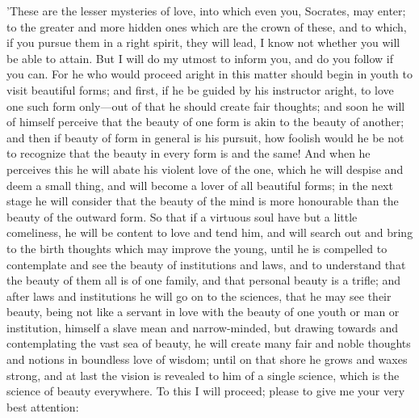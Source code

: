 \para[121] 'These are the lesser mysteries of love, into which even you, Socrates, may enter; to the greater and more hidden ones which are the crown of these, and to which, if you pursue them in a right spirit, they will lead, I know not whether you will be able to attain. But I will do my utmost to inform you, and do you follow if you can. For he who would proceed aright in this matter should begin in youth to visit beautiful forms; and first, if he be guided by his instructor aright, to love one such form only---out of that he should create fair thoughts; and soon he will of himself perceive that the beauty of one form is akin to the beauty of another; and then if beauty of form in general is his pursuit, how foolish would he be not to recognize that the beauty in every form is and the same! And when he perceives this he will abate his violent love of the one, which he will despise and deem a small thing, and will become a lover of all beautiful forms; in the next stage he will consider that the beauty of the mind is more honourable than the beauty of the outward form. So that if a virtuous soul have but a little comeliness, he will be content to love and tend him, and will search out and bring to the birth thoughts which may improve the young, until he is compelled to contemplate and see the beauty of institutions and laws, and to understand that the beauty of them all is of one family, and that personal beauty is a trifle; and after laws and institutions he will go on to the sciences, that he may see their beauty, being not like a servant in love with the beauty of one youth or man or institution, himself a slave mean and narrow-minded, but drawing towards and contemplating the vast sea of beauty, he will create many fair and noble thoughts and notions in boundless love of wisdom; until on that shore he grows and waxes strong, and at last the vision is revealed to him of a single science, which is the science of beauty everywhere. To this I will proceed; please to give me your very best attention:

